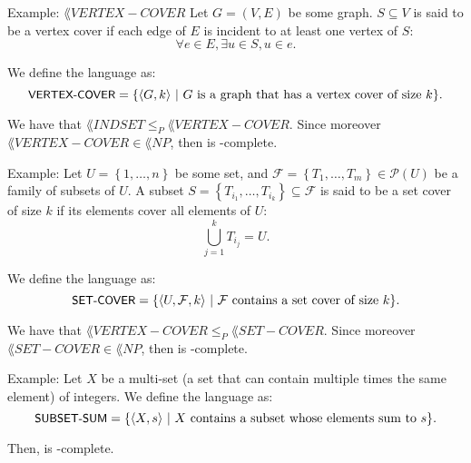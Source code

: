 \documentclass[a4paper]{article}
\begin{document}
\begin{parag}{Example: $\lang{VERTEX-COVER}$}
    Let $G = \left(V, E\right)$ be some graph. $S \subseteq V$ is said to be a vertex cover if each edge of $E$ is incident to at least one vertex of $S$: 
    \[\forall e \in E, \exists u \in S, u \in e.\]

    We define the language  as: 
    \[\lang{VERTEX-COVER} = \left\{\left\langle G, k \right\rangle \suchthat \text{$G$ is a graph that has a vertex cover of size $k$}\right\}.\]

    We have that $\lang{INDSET} \leq_P \lang{VERTEX-COVER}$. Since moreover $\lang{VERTEX-COVER} \in \lang{NP}$, then  is -complete.
\end{parag}

\begin{parag}{Example: }
    Let $U = \left\{1, \ldots, n\right\}$ be some set, and $\mathcal{F} = \left\{T_1, \ldots, T_m\right\} \in \mathcal{P}\left(U\right)$ be a family of subsets of $U$. A subset $S = \left\{T_{i_1}, \ldots, T_{i_k}\right\} \subseteq \mathcal{F}$ is said to be a set cover of size $k$ if its elements cover all elements of $U$: 
    \[\bigcup_{j=1}^{k} T_{i_j} = U.\]

    We define the language  as: 
    \[\lang{SET-COVER} = \left\{\left\langle U, \mathcal{F}, k \right\rangle \suchthat \text{$\mathcal{F}$ contains a set cover of size $k$}\right\}.\]

    We have that $\lang{VERTEX-COVER} \leq_P \lang{SET-COVER}$. Since moreover $\lang{SET-COVER} \in \lang{NP}$, then  is -complete.
\end{parag}

\begin{parag}{Example: }
    Let $X$ be a multi-set (a set that can contain multiple times the same element) of integers. We define the language  as: 
    \[\lang{SUBSET-SUM} = \left\{\left\langle X, s \right\rangle \suchthat \text{$X$ contains a subset whose elements sum to $s$}\right\}.\]

    Then,  is -complete.
\end{parag}
\end{document}
